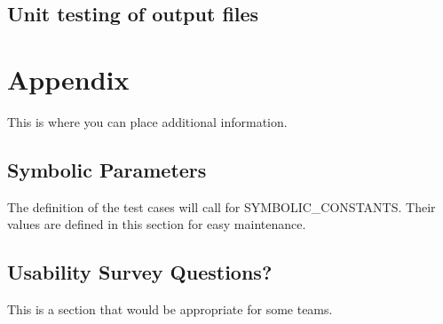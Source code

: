 \documentclass[12pt, titlepage]{article}
\begin{document}
\subsection{Unit testing of output files}		





\newpage

\section{Appendix}

This is where you can place additional information.

\subsection{Symbolic Parameters}

The definition of the test cases will call for SYMBOLIC\_CONSTANTS.
Their values are defined in this section for easy maintenance.

\subsection{Usability Survey Questions?}

This is a section that would be appropriate for some teams.
\end{document}
